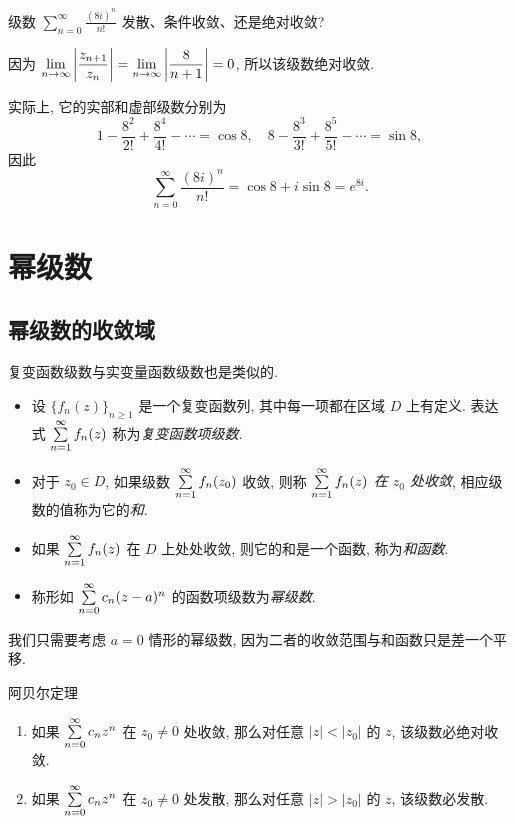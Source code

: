 \begin{example}
	级数 $\displaystyle\sum_{n=0}^\infty\frac{(8i)^n}{n!}$ 发散、条件收敛、还是绝对收敛?
\end{example}

\begin{solution}
	因为 $\displaystyle\lim_{n\to\infty}\left|\frac{z_{n+1}}{z_n}\right|=\lim_{n\to\infty}\left|\dfrac{8}{n+1}\right|=0$, 所以该级数绝对收敛.
\end{solution}

实际上, 它的实部和虚部级数分别为
\[1-\frac{8^2}{2!}+\frac{8^4}{4!}-\cdots=\cos 8,\quad
8-\frac{8^3}{3!}+\frac{8^5}{5!}-\cdots=\sin 8,\]
因此
\[\sum_{n=0}^\infty\frac{(8i)^n}{n!}=\cos 8+i\sin 8=e^{8i}.\]

\section{幂级数}

\subsection{幂级数的收敛域}

复变函数级数与实变量函数级数也是类似的.

\begin{definition}
	\begin{itemize}
		\item 设 $\{f_n(z)\}_{n\ge 1}$ 是一个复变函数列, 其中每一项都在区域 $D$ 上有定义.
		表达式 $\sum\limits_{n=1}^\infty f_n(z)$ 称为\emph{复变函数项级数}.
		\item 对于 $z_0\in D$, 如果级数 $\sum\limits_{n=1}^\infty f_n(z_0)$ 收敛, 则称 \emph{$\sum\limits_{n=1}^\infty f_n(z)$ 在 $z_0$ 处收敛}, 相应级数的值称为它的\emph{和}.
		\item 如果 $\sum\limits_{n=1}^\infty f_n(z)$ 在 $D$ 上处处收敛, 则它的和是一个函数, 称为\emph{和函数}.
		\item 称形如 $\sum\limits_{n=0}^\infty c_n(z-a)^n$ 的函数项级数为\emph{幂级数}.
	\end{itemize}
\end{definition}

我们只需要考虑 $a=0$ 情形的幂级数, 因为二者的收敛范围与和函数只是差一个平移.

\begin{theorem}{阿贝尔定理}
	\begin{enumerate}
		\item 如果 $\sum\limits_{n=0}^\infty c_nz^n$ 在 $z_0\neq 0$ 处收敛, 那么对任意 $|z|<|z_0|$ 的 $z$, 该级数必绝对收敛.
		\item 如果 $\sum\limits_{n=0}^\infty c_nz^n$ 在 $z_0\neq 0$ 处发散, 那么对任意 $|z|>|z_0|$ 的 $z$, 该级数必发散.
	\end{enumerate}
\end{theorem}

